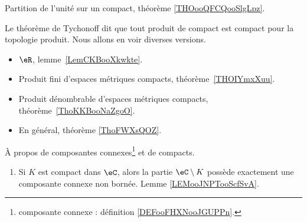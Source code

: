 \begin{description}
	      Partition de l'unité sur un compact, théorème \ref{THOooQFCQooSlgLpz}.

	\item[Produits de compacts]
	      Le théorème de Tychonoff dit que tout produit de compact est compact pour la topologie produit. Nous allons en voir diverses versions.
	      \begin{itemize}
		      \item
		            \( \eR\), lemme~\ref{LemCKBooXkwkte}.
		      \item
		            Produit fini d'espaces métriques compacts, théorème~\ref{THOIYmxXuu}.
		      \item
		            Produit dénombrable d'espaces métriques compacts, théorème~\ref{ThoKKBooNaZgoO}.
		      \item
		            En général, théorème \ref{ThoFWXsQOZ}.
	      \end{itemize}
	\item[Composante connexe]
	      À propos de composantes connexes\footnote{composante connexe : définition \ref{DEFooFHXNooJGUPPn}.} et de compacts.
	      \begin{enumerate}
		      \item
		            Si \( K\) est compact dans \( \eC\), alors la partie \( \eC\setminus K\) possède exactement une composante connexe non bornée. Lemme \ref{LEMooJNPTooScfSvA}.
	      \end{enumerate}
\end{description}
